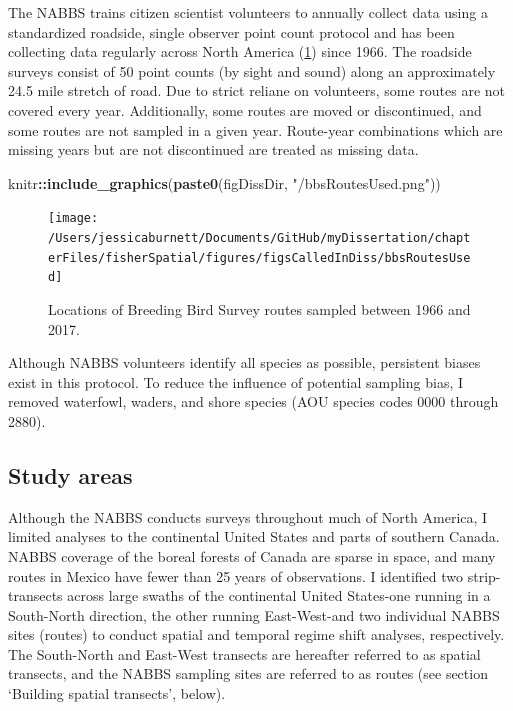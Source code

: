 \documentclass[12pt,twoside,openany]{reedthesis}
\newenvironment{Shaded}{\begin{snugshade}}{\end{snugshade}}
\newcommand{\KeywordTok}[1]{\textcolor[rgb]{0.13,0.29,0.53}{\textbf{#1}}}
\newcommand{\StringTok}[1]{\textcolor[rgb]{0.31,0.60,0.02}{#1}}
\newcommand{\OperatorTok}[1]{\textcolor[rgb]{0.81,0.36,0.00}{\textbf{#1}}}
\newcommand{\NormalTok}[1]{#1}
\begin{document}
The NABBS trains citizen scientist volunteers to annually collect data
using a standardized roadside, single observer point count protocol and
has been collecting data regularly across North America
(\ref{fig:bbsPoints}) since 1966. The roadside surveys consist of 50
point counts (by sight and sound) along an approximately 24.5 mile
stretch of road. Due to strict reliane on volunteers, some routes are
not covered every year. Additionally, some routes are moved or
discontinued, and some routes are not sampled in a given year.
Route-year combinations which are missing years but are not discontinued
are treated as missing data.
\begin{Shaded}
\begin{Highlighting}[]
\NormalTok{knitr}\OperatorTok{::}\KeywordTok{include_graphics}\NormalTok{(}\KeywordTok{paste0}\NormalTok{(figDissDir, }\StringTok{"/bbsRoutesUsed.png"}\NormalTok{)) }
\end{Highlighting}
\end{Shaded}
\begin{figure}
\texttt{[image: /Users/jessicaburnett/Documents/GitHub/myDissertation/chapterFiles/fisherSpatial/figures/figsCalledInDiss/bbsRoutesUsed]} \caption{Locations of Breeding Bird Survey routes sampled between 1966 and 2017.}\label{fig:bbsPoints}
\end{figure}
Although NABBS volunteers identify all species as possible, persistent
biases exist in this protocol. To reduce the influence of potential
sampling bias, I removed waterfowl, waders, and shore species (AOU
species codes 0000 through 2880).

\subsection{Study areas}\label{study-areas}

Although the NABBS conducts surveys throughout much of North America, I
limited analyses to the continental United States and parts of southern
Canada. NABBS coverage of the boreal forests of Canada are sparse in
space, and many routes in Mexico have fewer than 25 years of
observations. I identified two strip-transects across large swaths of
the continental United States-one running in a South-North direction,
the other running East-West-and two individual NABBS sites (routes) to
conduct spatial and temporal regime shift analyses, respectively. The
South-North and East-West transects are hereafter referred to as spatial
transects, and the NABBS sampling sites are referred to as routes (see
section `Building spatial transects', below).
\end{document}
